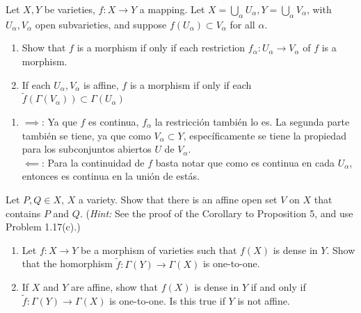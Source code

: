 \begin{prob}{6.14}
    Let \(X,Y\) be varieties, \(f:X\rightarrow Y\) a mapping. Let \(X=\bigcup_\alpha U_\alpha,Y=\bigcup_\alpha V_\alpha\), with \(U_\alpha,V_\alpha\) open subvarieties, and suppose \(f(U_\alpha)\subset V_\alpha\) for all \(\alpha\).
    \begin{enumerate}
        \item Show that \(f\) is a morphism if only if each restriction \(f_\alpha:U_\alpha\rightarrow V_\alpha\) of \(f\) is a morphism.
        \item If each \(U_\alpha,V_\alpha\) is affine, \(f\) is a morphism if only if each \(\tilde f(\Gamma(V_\alpha))\subset\Gamma(U_\alpha)\)
    \end{enumerate}
\end{prob}

\begin{sol}{6.14}
    \begin{enumerate}
        \item \(\implies\): Ya que \(f\) es continua, \(f_\alpha\) la restricción también lo es. La segunda parte también se tiene, ya que como \(V_\alpha\subset Y\), específicamente se tiene la propiedad para los subconjuntos abiertos \(U\) de \(V_\alpha\).\\
        \(\impliedby\): Para la continuidad de \(f\) basta notar que como es continua en cada \(U_\alpha\), entonces es continua en la unión de estás.
    \end{enumerate}
\end{sol}

\begin{prob}{6.23}
    Let \(P,Q\in X\), \(X\) a variety. Show that there is an affine open set \(V\) on \(X\) that contains \(P\) and \(Q\). (\textit{Hint:} See the proof of the Corollary to Proposition 5, and use Problem 1.17(c).)
\end{prob}

\begin{sol}{6.23}

\end{sol}

\begin{prob}{6.26}
    \begin{enumerate}
        \item Let \(f:X\rightarrow Y\) be a morphism of varieties such that \(f(X)\) is dense in \(Y\). Show that the homorphism \(\tilde f:\Gamma(Y)\rightarrow\Gamma(X)\) is one-to-one.
        \item If \(X\) and \(Y\) are affine, show that \(f(X)\) is dense in \(Y\) if and only if \(\tilde f:\Gamma(Y)\rightarrow\Gamma(X)\) is one-to-one. Is this true if \(Y\) is not affine.
    \end{enumerate}
\end{prob}

